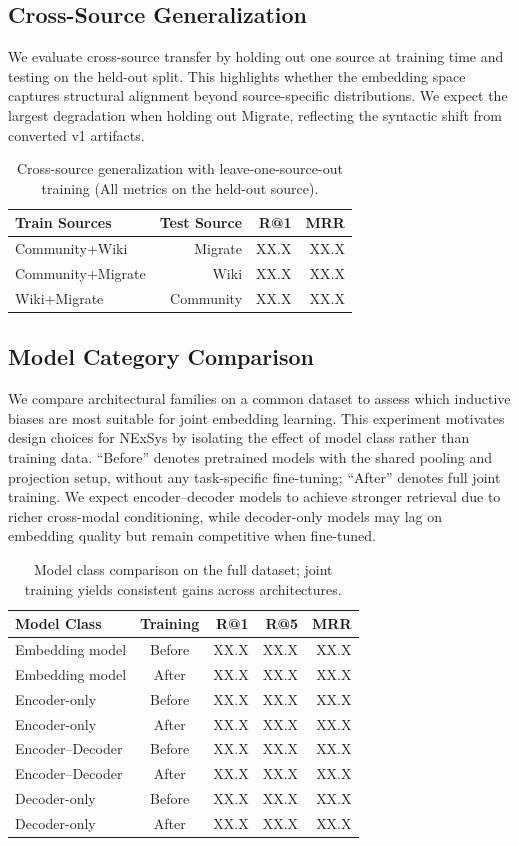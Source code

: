 \documentclass{article}
\begin{document}
\subsection{Cross-Source Generalization}
We evaluate cross-source transfer by holding out one source at training time and testing on the held-out split. This highlights whether the embedding space captures structural alignment beyond source-specific distributions. We expect the largest degradation when holding out Migrate, reflecting the syntactic shift from converted v1 artifacts.
\begin{table}[H]
\centering
\small
\caption{Cross-source generalization with leave-one-source-out training (All metrics on the held-out source).}
\label{tab:cross-source}
\begin{tabular}{lrrr}
\toprule
Train Sources & Test Source & R@1 & MRR \\
\midrule
Community+Wiki & Migrate & XX.X & XX.X \\
Community+Migrate & Wiki & XX.X & XX.X \\
Wiki+Migrate & Community & XX.X & XX.X \\
\bottomrule
\end{tabular}
\end{table}

\subsection{Model Category Comparison}
We compare architectural families on a common dataset to assess which inductive biases are most suitable for joint embedding learning. This experiment motivates design choices for NExSys by isolating the effect of model class rather than training data. ``Before'' denotes pretrained models with the shared pooling and projection setup, without any task-specific fine-tuning; ``After'' denotes full joint training. We expect encoder--decoder models to achieve stronger retrieval due to richer cross-modal conditioning, while decoder-only models may lag on embedding quality but remain competitive when fine-tuned.
\begin{table}[H]
\centering
\small
\caption{Model class comparison on the full dataset; joint training yields consistent gains across architectures.}
\label{tab:model-class}
\begin{tabular}{lcrrr}
\toprule
Model Class & Training & R@1 & R@5 & MRR \\
\midrule
Embedding model & Before & XX.X & XX.X & XX.X \\
Embedding model & After & XX.X & XX.X & XX.X \\
Encoder-only & Before & XX.X & XX.X & XX.X \\
Encoder-only & After & XX.X & XX.X & XX.X \\
Encoder--Decoder & Before & XX.X & XX.X & XX.X \\
Encoder--Decoder & After & XX.X & XX.X & XX.X \\
Decoder-only & Before & XX.X & XX.X & XX.X \\
Decoder-only & After & XX.X & XX.X & XX.X \\
\bottomrule
\end{tabular}
\end{table}
\end{document}
